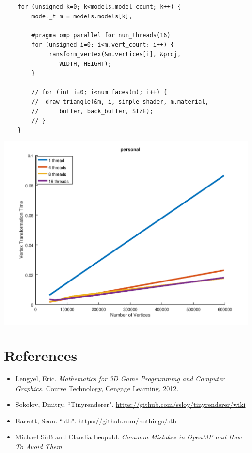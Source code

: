\documentclass[12pt]{article}
\begin{document}
\begin{verbatim}
	for (unsigned k=0; k<models.model_count; k++) {
		model_t m = models.models[k];

		#pragma omp parallel for num_threads(16)
		for (unsigned i=0; i<m.vert_count; i++) {
			transform_vertex(&m.vertices[i], &proj, 
				WIDTH, HEIGHT);
		}

		// for (int i=0; i<num_faces(m); i++) {
		// 	draw_triangle(&m, i, simple_shader, m.material, 
		// 		buffer, back_buffer, SIZE);
		// }
	}
\end{verbatim}

\includegraphics[scale=0.65]{parallel1_personal.png}

\section*{References}

\begin{itemize}
	\item Lengyel, Eric. \textit{Mathematics for 3D Game Programming and Computer Graphics.} Course Technology,
Cengage Learning, 2012.
	\item Sokolov, Dmitry. ``Tinyrenderer". \url{https://github.com/ssloy/tinyrenderer/wiki}
	\item Barrett, Sean. ``stb". \url{https://github.com/nothings/stb}
	\item Michael S\"uB and Claudia Leopold. \textit{Common Mistakes in OpenMP and How To Avoid Them}.
\end{itemize}
\end{document}
